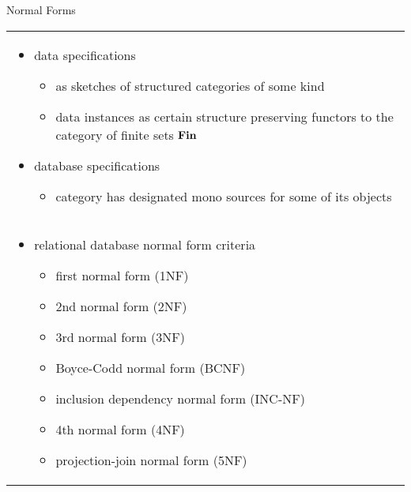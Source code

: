 \begin{frame}{Normal Forms}
\begin{center}
\begin{tabular}{p{12cm}}
\begin{itemize}
\item data specifications 
\begin{itemize}
    \item as sketches of structured categories of some kind
    \item data instances as certain structure preserving functors to the category of finite sets $\textbf{Fin}$
\end{itemize}
\item database specifications
\begin{itemize}
     \item category has designated mono sources for some of its objects 
\end{itemize}
\end{itemize} \\
\hdashline
\begin{itemize}
\item relational database normal form criteria  
\begin{itemize}
    \item first normal form (1NF)
    \item 2nd normal form (2NF)
    \item 3rd normal form (3NF)
    \item Boyce-Codd normal form (BCNF)
    \item inclusion dependency normal form (INC-NF)
    \item 4th normal form (4NF)
    \item projection-join normal form (5NF)
\end{itemize}
\end{itemize}
\end{tabular}
\end{center}
\end{frame}



\iffalse
\begin{frame}{Levels of Data Specification}
\begin{itemize}
\item logical   -- a sketch for a category of some kind
\item structural -- a sketch for some kind of category with distinguished morphisms indicating structural relationships
\item representational -- structural PLUS representational indicators for non-structural relationships
\item technological    -- IDL, SQL, XML 
\end{itemize}
\end{frame}
\fi

